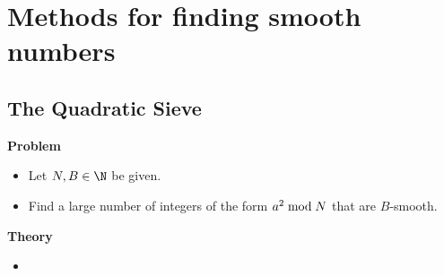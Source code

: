 
\section{Methods for finding smooth numbers}

\subsection{The Quadratic Sieve}

\begin{center}
	\begin{minipage}{0.70\textwidth}
		\begin{center}\textbf{Problem}\end{center}
		\begin{itemize}
		\item	\vskip -0.3cm Let $N,B \in \N$ be given.
		\item	Find a large number of integers of the form $a^{2}\;\textnormal{mod}\;N$ that are $B$-smooth.
		\end{itemize}
	\end{minipage}
\end{center}

\vskip 0.3cm
\noindent
\textbf{Theory}
\begin{itemize}
\item	
\end{itemize}